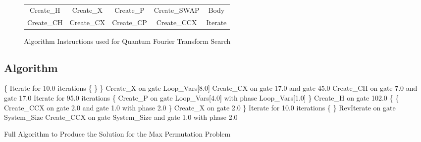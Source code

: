 \begin{figure}[h!]
\begin{center}
 \begin{tabular}{|ccccc|}
\hline
  Create\_H & Create\_X & Create\_P & Create\_SWAP & Body \\
  Create\_CH & Create\_CX & Create\_CP & Create\_CCX & Iterate \\
\hline
 \end{tabular}
\end{center}
\caption{Algorithm Instructions used for Quantum Fourier Transform Search}
\label{fig:qftgates}
\end{figure}

\clearpage
\subsection{Algorithm}
\begin{algorithm}
 \begin{algorithmic}
\STATE \{
\STATE Iterate for 10.0 iterations \{
\STATE \}
\STATE \}
\STATE Create\_X on gate Loop\_Vars[8.0]
\STATE Create\_CX on gate 17.0 and gate 45.0
\STATE Create\_CH on gate 7.0 and gate 17.0
\STATE Iterate for 95.0 iterations \{
\STATE Create\_P on gate Loop\_Vars[4.0] with phase Loop\_Vars[1.0]
\STATE \}
\STATE Create\_H on gate 102.0
\STATE \{
\STATE \{
\STATE Create\_CCX on gate 2.0 and gate 1.0 with phase 2.0
\STATE \}
\STATE Create\_X on gate 2.0
\STATE \}
\STATE Iterate for 10.0 iterations \{
\STATE \}
\STATE RevIterate on gate System\_Size
\STATE Create\_CCX on gate System\_Size and gate 1.0 with phase 2.0
 \end{algorithmic}
\caption{Full Algorithm to Produce the Solution for the Max Permutation Problem}
\label{alg:03permfullalg}
\end{algorithm}

\clearpage
